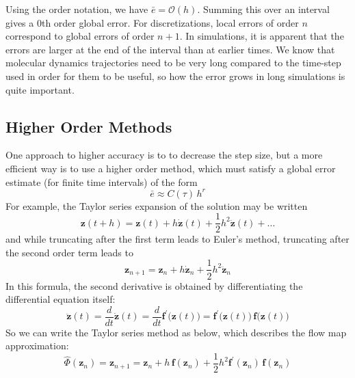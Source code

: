     Using the order notation, we have $\bar{e} = \mathcal{O}(h)$. Summing this over an interval gives a $0$th order global error. For discretizations, local errors of order $n$ correspond to global errors of order $n+1$. In simulations, it is apparent that the errors are larger at the end of the interval than at earlier times. We know that molecular dynamics trajectories need to be very long compared to the time-step used in order for them to be useful, so how the error grows in long simulations is quite important. 

  \subsection{Higher Order Methods}

    One approach to higher accuracy is to to decrease the step size, but a more efficient way is to use a higher order method, which must satisfy a global error estimate (for finite time intervals) of the form 
    \begin{equation}
      \bar{e} \approx C(\tau) \, h ^r
    \end{equation}
    For example, the Taylor series expansion of the solution may be written 
    \begin{equation}
      \mathbf{z}(t + h) = \mathbf{z}(t) + h \boldsymbol{\dot{z}} (t) + \frac{1}{2} h^2 \boldsymbol{\ddot{z}}(t) + \ldots
    \end{equation}
    and while truncating after the first term leads to Euler's method, truncating after the second order term leads to 
    \begin{equation}
      \mathbf{z}_{n+1} = \mathbf{z}_n + h\boldsymbol{\dot{z}}_n + \frac{1}{2} h^2 \boldsymbol{\ddot{z}}_n
    \end{equation}
    In this formula, the second derivative is obtained by differentiating the differential equation itself: 
    \begin{equation}
      \boldsymbol{\ddot{z}}(t) = \frac{d}{dt} \boldsymbol{\dot{z}}(t) = \frac{d}{dt} \mathbf{f}^\prime \big( \mathbf{z}(t)\big) = \mathbf{f}^\prime\big( \mathbf{z}(t)\big) \, \mathbf{f}\big(\mathbf{z}(t)\big)
    \end{equation}
    So we can write the Taylor series method as below, which describes the flow map approximation: 
    \begin{equation}
      \hat{\Phi} (\mathbf{z}_{n}) = \mathbf{z}_{n+1} = \mathbf{z}_n + h\, \mathbf{f}(\mathbf{z}_n) + \frac{1}{2} h^2 \mathbf{f}^\prime (\mathbf{z}_n) \, \mathbf{f}(\mathbf{z}_n)
    \end{equation}


